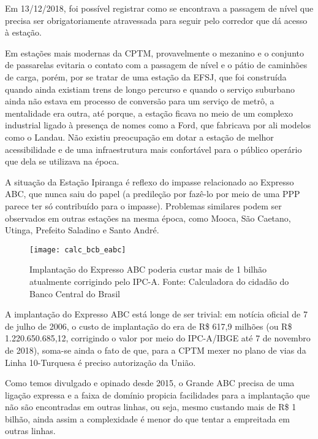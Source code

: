 \documentclass[11pt,fleqn]{book} %
\begin{document}
Em 13/12/2018, foi possível registrar como se encontrava a passagem de nível que precisa ser obrigatoriamente atravessada para seguir pelo corredor que dá acesso à estação.

Em estações mais modernas da CPTM, provavelmente o mezanino e o conjunto de passarelas evitaria o contato com a passagem de nível e o pátio de caminhões de carga, porém, por se tratar de uma estação da EFSJ, que foi construída quando ainda existiam trens de longo percurso e quando o serviço suburbano ainda não estava em processo de conversão para um serviço de metrô, a mentalidade era outra, até porque, a estação ficava no meio de um complexo industrial ligado à presença de nomes como a Ford, que fabricava por ali modelos como o Landau. Não existiu preocupação em dotar a estação de melhor acessibilidade e de uma infraestrutura mais confortável para o público operário que dela se utilizava na época.

A situação da Estação Ipiranga é reflexo do impasse relacionado ao Expresso ABC, que nunca saiu do papel (a predileção por fazê-lo por meio de uma PPP parece ter só contribuído para o impasse). Problemas similares podem ser observados em outras estações na mesma época, como Mooca, São Caetano, Utinga, Prefeito Saladino e Santo André.

\begin{figure}[htb]
	\caption[Valor corrigido do Expresso ABC]{Implantação do Expresso ABC poderia custar mais de 1 bilhão atualmente corrigindo pelo IPC-A. Fonte: Calculadora do cidadão do Banco Central do Brasil}
	\centering
	\texttt{[image: calc\_bcb\_eabc]}
	\label{fig:calc_bcb_eabc}
\end{figure}


A implantação do Expresso ABC está longe de ser trivial: em notícia oficial de 7 de julho de 2006, o custo de implantação do era de R\$ 617,9 milhões (ou R\$ 1.220.650.685,12, corrigindo o valor por meio do IPC-A/IBGE até 7 de novembro de 2018), soma-se ainda o fato de que, para a CPTM mexer no plano de vias da Linha 10-Turquesa é preciso autorização da União.

Como temos divulgado e opinado desde 2015, o Grande ABC precisa de uma ligação expressa e a faixa de domínio propicia facilidades para a implantação que não são encontradas em outras linhas, ou seja, mesmo custando mais de R\$ 1 bilhão, ainda assim a complexidade é menor do que tentar a empreitada em outras linhas.
\end{document}
